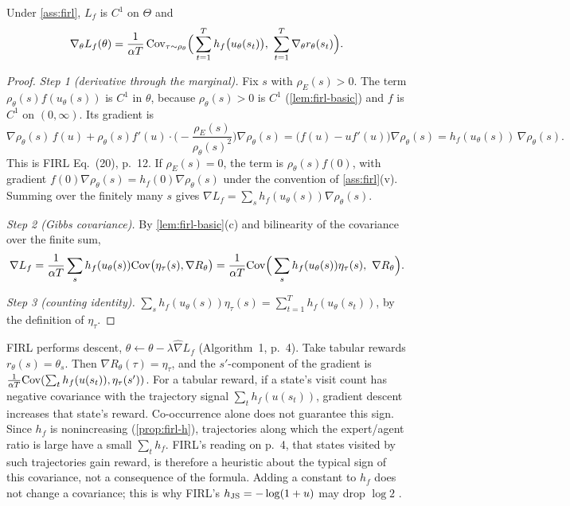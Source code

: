 \begin{theorem}\label{thm:firl}
Under \cref{ass:firl}, $L_f$ is $C^1$ on $\Theta$ and
\[
\nabla_\theta L_f(\theta)=\frac1{\alpha T}\,\Cov_{\tau\sim\rho_\theta}\Big(\sum_{t=1}^Th_f\big(u_\theta(s_t)\big),\ \sum_{t=1}^T\nabla_\theta r_\theta(s_t)\Big).
\]
\end{theorem}
\begin{proof}
\emph{Step 1 (derivative through the marginal).}
Fix $s$ with $\rho_E(s)>0$. The term $\rho_\theta(s)f(u_\theta(s))$ is $C^1$ in $\theta$, because $\rho_\theta(s)>0$ is $C^1$ (\cref{lem:firl-basic}) and $f$ is $C^1$ on $(0,\infty)$. Its gradient is
\[
\nabla\rho_\theta(s)\,f(u)+\rho_\theta(s)f'(u)\cdot\Big(-\frac{\rho_E(s)}{\rho_\theta(s)^2}\Big)\nabla\rho_\theta(s)
=\big(f(u)-uf'(u)\big)\nabla\rho_\theta(s)=h_f(u_\theta(s))\,\nabla\rho_\theta(s).
\]
This is FIRL Eq.~(20), p.~12.
If $\rho_E(s)=0$, the term is $\rho_\theta(s)f(0)$, with gradient $f(0)\nabla\rho_\theta(s)=h_f(0)\nabla\rho_\theta(s)$ under the convention of \cref{ass:firl}(v).
Summing over the finitely many $s$ gives $\nabla L_f=\sum_sh_f(u_\theta(s))\nabla\rho_\theta(s)$.

\emph{Step 2 (Gibbs covariance).} By \cref{lem:firl-basic}(c) and bilinearity of the covariance over the finite sum,
\[
\nabla L_f=\frac1{\alpha T}\sum_sh_f(u_\theta(s))\mathrm{Cov}\big(\eta_\tau(s),\nabla R_\theta\big)
=\frac1{\alpha T}\mathrm{Cov}\Big(\sum_sh_f(u_\theta(s))\eta_\tau(s),\ \nabla R_\theta\Big).
\]

\emph{Step 3 (counting identity).} $\sum_sh_f(u_\theta(s))\eta_\tau(s)=\sum_{t=1}^Th_f(u_\theta(s_t))$, by the definition of $\eta_\tau$.
\end{proof}

\begin{remark}\label{rem:firl-sign}
FIRL performs descent, $\theta\leftarrow\theta-\lambda\hat\nabla L_f$ (Algorithm~1, p.~4).
Take tabular rewards $r_\theta(s)=\theta_s$. Then $\nabla R_\theta(\tau)=\eta_\tau$, and the $s'$-component of the gradient is $\frac1{\alpha T}\mathrm{Cov}(\sum_th_f(u(s_t)),\eta_\tau(s'))$.
For a tabular reward, if a state's visit count has negative covariance with the trajectory signal $\sum_th_f(u(s_t))$, gradient descent increases that state's reward.
Co-occurrence alone does not guarantee this sign.
Since $h_f$ is nonincreasing (\cref{prop:firl-h}), trajectories along which the expert/agent ratio is large have a small $\sum_th_f$. FIRL's reading on p.~4, that states visited by such trajectories gain reward, is therefore a heuristic about the typical sign of this covariance, not a consequence of the formula.
Adding a constant to $h_f$ does not change a covariance; this is why FIRL's $h_{\mathrm{JS}}=-\log(1+u)$ may drop $\log2$ .
\end{remark}

